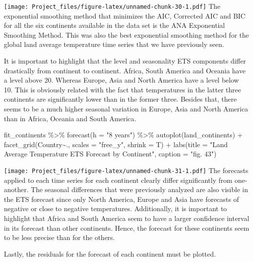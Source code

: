 \documentclass[
]{article}
\newenvironment{Shaded}{\begin{snugshade}}{\end{snugshade}}
\newcommand{\AttributeTok}[1]{\textcolor[rgb]{0.77,0.63,0.00}{#1}}
\newcommand{\FunctionTok}[1]{\textcolor[rgb]{0.00,0.00,0.00}{#1}}
\newcommand{\NormalTok}[1]{#1}
\newcommand{\SpecialCharTok}[1]{\textcolor[rgb]{0.00,0.00,0.00}{#1}}
\newcommand{\StringTok}[1]{\textcolor[rgb]{0.31,0.60,0.02}{#1}}
\begin{document}
\texttt{[image: Project\_files/figure-latex/unnamed-chunk-30-1.pdf]} The
exponential smoothing method that minimizes the AIC, Corrected AIC and
BIC for all the six continents available in the data set is the ANA
Exponential Smoothing Method. This was also the best exponential
smoothing method for the global land average temperature time series
that we have previously seen.

It is important to highlight that the level and seasonality ETS
components differ drastically from continent to continent. Africa, South
America and Oceania have a level above 20. Whereas Europe, Asia and
North America have a level below 10. This is obviously related with the
fact that temperatures in the latter three continents are significantly
lower than in the former three. Besides that, there seems to be a much
higher seasonal variation in Europe, Asia and North America than in
Africa, Oceania and South America.

\begin{Shaded}
\begin{Highlighting}[]
\NormalTok{fit\_continents }\SpecialCharTok{\%\textgreater{}\%} 
  \FunctionTok{forecast}\NormalTok{(}\AttributeTok{h =} \StringTok{"8 years"}\NormalTok{) }\SpecialCharTok{\%\textgreater{}\%} 
  \FunctionTok{autoplot}\NormalTok{(land\_continents) }\SpecialCharTok{+} \FunctionTok{facet\_grid}\NormalTok{(Country}\SpecialCharTok{\textasciitilde{}}\NormalTok{., }\AttributeTok{scales =} \StringTok{"free\_y"}\NormalTok{, }\AttributeTok{shrink =}\NormalTok{ T)  }\SpecialCharTok{+} \FunctionTok{labs}\NormalTok{(}\AttributeTok{title =} \StringTok{"Land Average Temperature ETS Forecast by Continent"}\NormalTok{, }\AttributeTok{caption =} \StringTok{"fig. 43"}\NormalTok{)}
\end{Highlighting}
\end{Shaded}

\texttt{[image: Project\_files/figure-latex/unnamed-chunk-31-1.pdf]} The
forecasts applied to each time series for each continent clearly differ
significantly from one-another. The seasonal differences that were
previously analyzed are also visible in the ETS forecast since only
North America, Europe and Asia have forecasts of negative or close to
negative temperatures. Additionally, it is important to highlight that
Africa and South America seem to have a larger confidence interval in
its forecast than other continents. Hence, the forecast for these
continents seem to be less precise than for the others.

Lastly, the residuals for the forecast of each continent must be
plotted.
\end{document}
